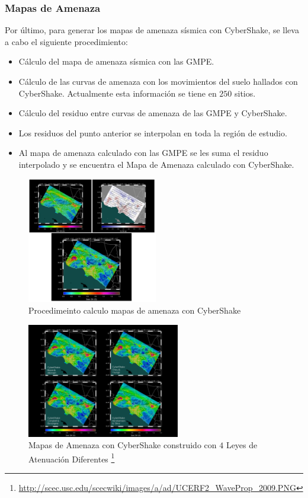 \begin{frame}[allowframebreaks]
\frametitle{Mapas de Amenaza}
%
\justifying
%
Por último, para generar los mapas de amenaza sísmica con CyberShake, se lleva a cabo el siguiente procedimiento:
%
\begin{itemize}
%
	\item Cálculo del mapa de amenaza sísmica con las GMPE.
	\item Cálculo de las curvas de amenaza con los movimientos del suelo hallados con CyberShake. Actualmente esta información se tiene en $250$ sitios.
	\item Cálculo del residuo entre curvas de amenaza de las GMPE y CyberShake.
	\item Los residuos del punto anterior se interpolan en toda la región de estudio.
	\item Al mapa de amenaza calculado con las GMPE se les suma el residuo interpolado y se encuentra el Mapa de Amenaza calculado con CyberShake. 
%
\end{itemize}
%
\begin{figure}[h]
	\centering
	\includegraphics[height=5.5cm]{img/ProcesoMapaAmenaza.pdf}
	\caption{Procedimeinto calculo mapas de amenaza con CyberShake \cite[figura 9, página 12]{gravesetal}}
	\vspace{-.5 cm}
\end{figure}
%
\begin{figure}[h]
	\centering
	\includegraphics[height=5cm]{img/MapaAmenaza.pdf}
	\caption{Mapas de Amenaza con CyberShake construido con $4$ Leyes de Atenuación Diferentes \footnote{\tiny \url{http://scec.usc.edu/scecwiki/images/a/ad/UCERF2_WaveProp_2009.PNG}}}
	\vspace{-.5 cm}
\end{figure}
%
%
\end{frame}
